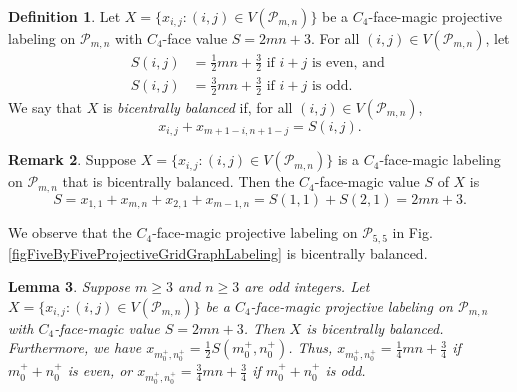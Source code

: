 \documentclass[12pt]{amsart}
\theoremstyle{definition}
\newtheorem{definition}{Definition}
\newtheorem{remark}[definition]{Remark}
\theoremstyle{plain}
\newtheorem{lemma}[definition]{Lemma}
\begin{document}
\begin{definition} \label{defnBicentrallyBalanced}
Let $X=\{x_{i,j}: (i,j) \in V(\mathcal{P}_{m,n}) \}$ be a $C_4$-face-magic projective labeling on $\mathcal{P}_{m,n}$ with
$C_4$-face value $S=2mn+3$.
For all $(i,j) \in V(\mathcal{P}_{m,n})$, let
\begin{align*}
  S(i,j) &= \tfrac{1}{2}mn+ \tfrac{3}{2} \mbox{ if } i+j \mbox{ is even, and } \\
   S(i,j) &= \tfrac{3}{2}mn+ \tfrac{3}{2} \mbox{ if } i+j \mbox{ is odd.}
\end{align*}
We say that $X$ is \emph{bicentrally balanced} if, for all $(i,j) \in V(\mathcal{P}_{m,n})$,
\begin{equation*}
  x_{i,j} + x_{m+1-i,n+1-j} = S(i,j).
\end{equation*}
\end{definition}

\begin{remark} \label{remBicentrallyBalancedHasValue2MNPlus3}
Suppose $X=\{x_{i,j}: (i,j) \in V(\mathcal{P}_{m,n}) \}$ is a $C_4$-face-magic labeling on $\mathcal{P}_{m,n}$ that is bicentrally balanced.
Then the $C_4$-face-magic value $S$ of $X$ is
\begin{equation*}
  S = x_{1,1} + x_{m,n} + x_{2,1} + x_{m-1,n}=  S(1,1) + S(2,1) = 2mn+3.
\end{equation*}
\end{remark}

We observe that the $C_4$-face-magic projective labeling on $\mathcal{P}_{5,5}$ in Fig. \ref{figFiveByFiveProjectiveGridGraphLabeling} is bicentrally balanced.

\begin{lemma} \label{lemmaProjectiveGridSemiC4FaceValueBalance}
Suppose $m \geqslant 3$ and  $n \geqslant 3$ are odd integers.
Let $X = \{ x_{i,j} : (i,j)\in V(\mathcal{P}_{m,n}) \}$ be a $C_4$-face-magic projective labeling on $\mathcal{P}_{m,n}$
with $C_4$-face-magic value $S=2mn+3$.
Then $X$ is bicentrally balanced. Furthermore, we have $x_{m_0^{+},n_0^{+}}= \tfrac{1}{2}S(m_0^{+},n_0^{+})$.
Thus, $x_{m_0^{+},n_0^{+}}=\tfrac{1}{4}mn+ \tfrac{3}{4}$ if $m^{+}_0 + n^{+}_0$ is even, or
$x_{m_0^{+},n_0^{+}}=\tfrac{3}{4}mn+ \tfrac{3}{4}$ if $m^{+}_0 + n^{+}_0$ is odd.
\end{lemma}
\end{document}

